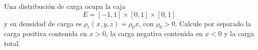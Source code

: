 Una distribución de carga ocupa la caja
\[
E=[-1,1]\times[0,1]\times[0,1]
\]
y su densidad de carga es $\rho_e(x,y,z)=\rho_0x$, con $\rho_0>0$. Calcule por separado la carga positiva contenida en $x>0$, la carga negativa contenida en $x<0$ y la carga total.
